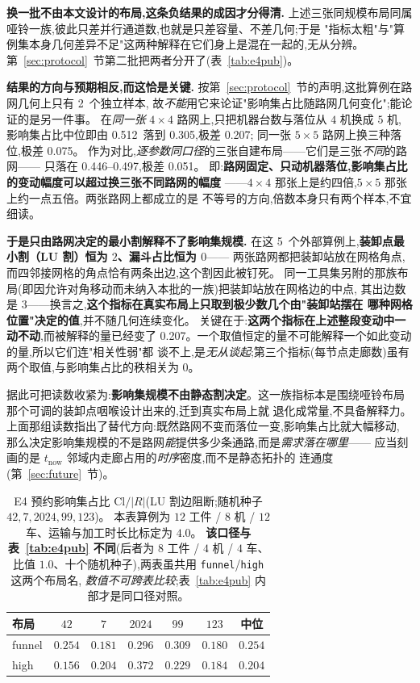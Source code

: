 \documentclass[manuscript,screen,review]{acmart}
\newcommand{\NPubInst}{5}
\newcommand{\NPubNets}{2}
\newcommand{\PubCloLo}{0.305}
\newcommand{\PubCloHi}{0.512}
\newcommand{\PubCloSpread}{0.207}
\newcommand{\PubCloSpreadBig}{0.075}
\newcommand{\SelfCloLo}{0.446}
\newcommand{\SelfCloHi}{0.497}
\newcommand{\SelfCloSpread}{0.051}
\begin{document}
\textbf{换一批不由本文设计的布局,这条负结果的成因才分得清.}
上述三张同规模布局同属哑铃一族,彼此只差并行通道数,也就是只差容量、不差几何;于是
"指标太粗"与"算例集本身几何差异不足"这两种解释在它们身上是混在一起的,无从分辨。
第~\ref{sec:protocol}~节第二批把两者分开了(表~\ref{tab:e4pub})。

\textbf{结果的方向与预期相反,而这恰是关键.}
按第~\ref{sec:protocol}~节的声明,这批算例在路网几何上只有 \NPubNets\ 个独立样本,
故\emph{不能}用它来论证"影响集占比随路网几何变化";能论证的是另一件事。
在\emph{同一张} \(4\times 4\) 路网上,只把机器台数与落位从 \(4\) 机换成 \(5\) 机,
影响集占比中位即由 \PubCloHi\ 落到 \PubCloLo,极差 \PubCloSpread;
同一张 \(5\times 5\) 路网上换三种落位,极差 \PubCloSpreadBig。
作为对比,\emph{逐参数同口径}的三张自建布局——它们是三张\emph{不同}的路网——
只落在 \SelfCloLo--\SelfCloHi,极差 \SelfCloSpread。
即:\textbf{路网固定、只动机器落位,影响集占比的变动幅度可以超过换三张不同路网的幅度}
——\(4\times 4\) 那张上是约四倍,\(5\times 5\) 那张上约一点五倍。两张路网上都成立的是
不等号的方向,倍数本身只有两个样本,不宜细读。

\textbf{于是只由路网决定的最小割解释不了影响集规模.}
在这 \NPubInst\ 个外部算例上,\textbf{装卸点最小割（LU 割）恒为 \(2\)、漏斗占比恒为 \(0\)}——
两张路网都把装卸站放在网格角点,而四邻接网格的角点恰有两条出边,这个割因此被钉死。
同一工具集另附的那族布局(即因允许对角移动而未纳入本批的一族)把装卸站放在网格边的中点,
其出边数是 \(3\)——换言之,\textbf{这个指标在真实布局上只取到极少数几个由"装卸站摆在
哪种网格位置"决定的值},并不随几何连续变化。
关键在于:\textbf{这两个指标在上述整段变动中一动不动},而被解释的量已经变了
\PubCloSpread。一个取值恒定的量不可能解释一个如此变动的量,所以它们连"相关性弱"都
谈不上,是\emph{无从谈起};第三个指标(每节点走廊数)虽有两个取值,与影响集占比的秩相关为
\(0\)。

据此可把读数收紧为:\textbf{影响集规模不由静态割决定}。这一族指标本是围绕哑铃布局那个可调的装卸点咽喉设计出来的,迁到真实布局上就
退化成常量,不具备解释力。
上面那组读数指出了替代方向:既然路网不变而落位一变,影响集占比就大幅移动,
那么决定影响集规模的不是路网\emph{能}提供多少条通路,而是\emph{需求落在哪里}——
应当刻画的是 \(t_{\mathrm{now}}\) 邻域内走廊占用的\emph{时序}密度,而不是静态拓扑的
连通度(第~\ref{sec:future}~节)。

\begin{table}[t]
\centering
\caption{E4 预约影响集占比 \(\mathrm{Cl}/|R|\)(LU 割边阻断;随机种子 \(42,7,2024,99,123\))。
本表算例为 \(12\) 工件 / \(8\) 机 / \(12\) 车、运输与加工时长比标定为 \(4.0\)。
\textbf{该口径与表~\ref{tab:e4pub} 不同}(后者为 \(8\) 工件 / \(4\) 机 / \(4\) 车、
比值 \(1.0\)、十个随机种子),两表虽共用 \texttt{funnel}/\texttt{high} 这两个布局名,
\emph{数值不可跨表比较};表~\ref{tab:e4pub} 内部才是同口径对照。}
\label{tab:e4}
\small
\begin{tabular}{@{}lcccccc@{}}
\toprule
布局 & \(42\) & \(7\) & \(2024\) & \(99\) & \(123\) & 中位 \\
\midrule
funnel & \(0.254\) & \(0.181\) & \(0.296\) & \(0.309\) & \(0.180\) & \(0.254\) \\
high & \(0.156\) & \(0.204\) & \(0.372\) & \(0.229\) & \(0.184\) & \(0.204\) \\
\bottomrule
\end{tabular}
\end{table}
\end{document}
